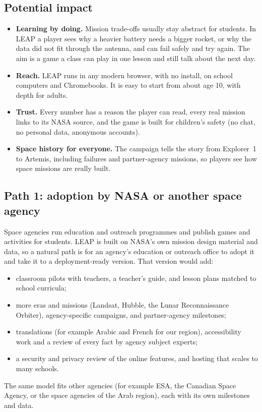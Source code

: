 \documentclass[11pt,a4paper]{article}
\begin{document}
\subsection{Potential impact}
\begin{itemize}
  \item \textbf{Learning by doing.} Mission trade-offs usually stay abstract for students. In LEAP a player sees why a
        heavier battery needs a bigger rocket, or why the data did not fit through the antenna, and can fail safely and
        try again. The aim is a game a class can play in one lesson and still talk about the next day.
  \item \textbf{Reach.} LEAP runs in any modern browser, with no install, on school computers and Chromebooks. It is
        easy to start from about age 10, with depth for adults.
  \item \textbf{Trust.} Every number has a reason the player can read, every real mission links to its NASA source,
        and the game is built for children's safety (no chat, no personal data, anonymous accounts).
  \item \textbf{Space history for everyone.} The campaign tells the story from Explorer~1 to Artemis, including
        failures and partner-agency missions, so players see how space missions are really built.
\end{itemize}

\subsection{Path 1: adoption by NASA or another space agency}
Space agencies run education and outreach programmes and publish games and activities for students. LEAP is built
on NASA's own mission design material and data, so a natural path is for an agency's education or outreach office to
adopt it and take it to a deployment-ready version. That version would add:
\begin{itemize}
  \item classroom pilots with teachers, a teacher's guide, and lesson plans matched to school curricula;
  \item more eras and missions (Landsat, Hubble, the Lunar Reconnaissance Orbiter), agency-specific campaigns, and
        partner-agency milestones;
  \item translations (for example Arabic and French for our region), accessibility work and a review of every fact by
        agency subject experts;
  \item a security and privacy review of the online features, and hosting that scales to many schools.
\end{itemize}
The same model fits other agencies (for example ESA, the Canadian Space Agency, or the space agencies of the Arab
region), each with its own milestones and data.
\end{document}
